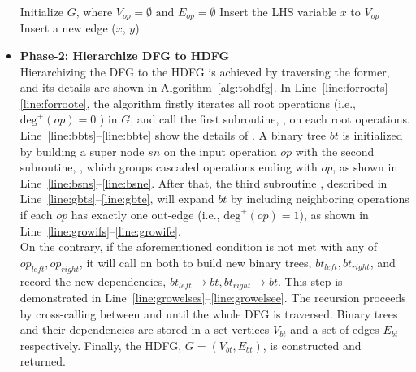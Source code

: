 \begin{itemize}
\begin{algorithm}[ht!]
\begin{algorithmic}[1]
                \State      Initialize $G \textrm{, where } V_{op} = \emptyset \textrm{ and } E_{op} = \emptyset $
                 \label{line:forssas}    
                \State      Insert the LHS variable $x$ to $V_{op}$
                \State      Insert a new edge ($x$, $y$)
                \EndFor
                \EndFor                                                         \label{line:forssae}
            \end{algorithmic}
            \label{alg:2dfg}
        \end{algorithm}

    \item \textbf{Phase-2: Hierarchize DFG to HDFG} \\\indent
        Hierarchizing the DFG to the HDFG is achieved by traversing the former, and its details are shown in Algorithm~\ref{alg:tohdfg}.
        In Line~\ref{line:forroots}--\ref{line:forroote}, the algorithm firstly iterates all root operations (i.e., $\textrm{deg}^+(op)=0$ ) in $G$,
        and call the first subroutine, , on each root operations.
        Line~\ref{line:bbts}--\ref{line:bbte} show the details of .
        A binary tree $bt$ is initialized by building a super node $sn$ on the input operation $op$ with the second subroutine, , which groups cascaded operations ending with $op$, as shown in Line~\ref{line:bsns}--\ref{line:bsne}.  After that, the third subroutine , described in Line~\ref{line:gbts}--\ref{line:gbte}, will expand $bt$ by including neighboring operations if each $op$ has exactly one out-edge (i.e., $\textrm{deg}^+(op)=1$), as shown in Line~\ref{line:growifs}--\ref{line:growife}.  \\\indent On the contrary, if the aforementioned condition is not met with any of $op_{left}, op_{right}$, 
        it will call  on both to build new binary trees, $bt_{left}, bt_{right}$,
        and record the new dependencies, $bt_{left} \rightarrow bt, bt_{right} \rightarrow bt$.
        This step is demonstrated in Line~\ref{line:growelses}--\ref{line:growelsee}. 
        The recursion proceeds by cross-calling between  and  until the whole DFG is traversed.
        Binary trees and their dependencies are stored in a set vertices $V_{bt}$ and a set of edges $E_{bt}$ respectively.
        Finally, the HDFG, $\bar{G} = ( V_{bt} , E_{bt} )$, is constructed and returned.
\end{itemize}


